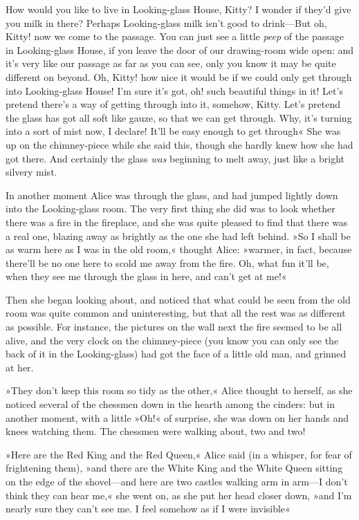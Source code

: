 How would you like to live in Looking-glass House, Kitty? I wonder if they'd give you milk in there? Perhaps Looking-glass milk isn't good to drink—But oh, Kitty! now we come to the passage. You can just see a little \textit{peep} of the passage in Looking-glass House, if you leave the door of our drawing-room wide open: and it's very like our passage as far as you can see, only you know it may be quite different on beyond. Oh, Kitty! how nice it would be if we could only get through into Looking-glass House! I'm sure it's got, oh! such beautiful things in it! Let's pretend there's a way of getting through into it, somehow, Kitty. Let's pretend the glass has got all soft like gauze, so that we can get through. Why, it's turning into a sort of mist now, I declare! It'll be easy enough to get through\longdash« She was up on the chimney-piece while she said this, though she hardly knew how she had got there. And certainly the glass \textit{was} beginning to melt away, just like a bright silvery mist.

In another moment Alice was through the glass, and had jumped lightly down into the Looking-glass room. The very first thing she did was to look whether there was a fire in the fireplace, and she was quite pleased to find that there was a real one, blazing away as brightly as the one she had left behind. »So I shall be as warm here as I was in the old room,« thought Alice: »warmer, in fact, because there'll be no one here to scold me away from the fire. Oh, what fun it'll be, when they see me through the glass in here, and can't get at me!«

Then she began looking about, and noticed that what could be seen from the old room was quite common and uninteresting, but that all the rest was as different as possible. For instance, the pictures on the wall next the fire seemed to be all alive, and the very clock on the chimney-piece (you know you can only see the back of it in the Looking-glass) had got the face of a little old man, and grinned at her.

»They don't keep this room so tidy as the other,« Alice thought to herself, as she noticed several of the chessmen down in the hearth among the cinders: but in another moment, with a little »Oh!« of surprise, she was down on her hands and knees watching them. The chessmen were walking about, two and two!

»Here are the Red King and the Red Queen,« Alice said (in a whisper, for fear of frightening them), »and there are the White King and the White Queen sitting on the edge of the shovel—and here are two castles walking arm in arm—I don't think they can hear me,« she went on, as she put her head closer down, »and I'm nearly sure they can't see me. I feel somehow as if I were invisible\longdash«

